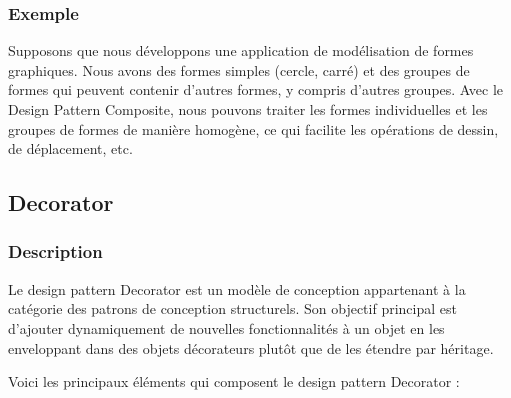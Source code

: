 \documentclass[french]{article}
\begin{document}
\subsubsection{Exemple}

Supposons que nous développons une application de modélisation de formes graphiques. Nous avons des formes simples (cercle, carré) et des groupes de formes qui peuvent contenir d'autres formes, y compris d'autres groupes. Avec le Design Pattern Composite, nous pouvons traiter les formes individuelles et les groupes de formes de manière homogène, ce qui facilite les opérations de dessin, de déplacement, etc.




\newpage

\subsection{Decorator}

\subsubsection{Description}

Le design pattern Decorator est un modèle de conception appartenant à la catégorie des patrons de conception structurels. Son objectif principal est d'ajouter dynamiquement de nouvelles fonctionnalités à un objet en les enveloppant dans des objets décorateurs plutôt que de les étendre par héritage.

Voici les principaux éléments qui composent le design pattern Decorator :
\end{document}
